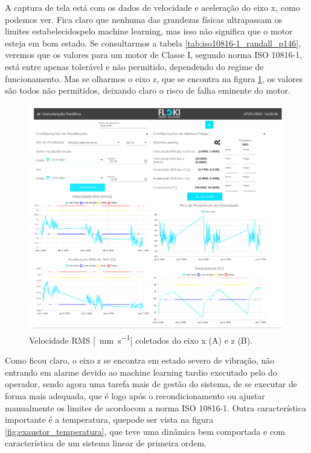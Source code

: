 A captura de tela está com os dados de velocidade e aceleração do eixo x, como podemos ver. Fica claro que nenhuma das grandezas físicas
ultrapassam os limites estabelecidospelo machine learning, mas isso não significa que o motor esteja em bom estado. Se consultarmos a tabela 
\ref{tab:iso10816-1_randall_p146}, veremos que os valores para um motor de Classe I, segundo norma  ISO 10816-1, está entre apenas tolerável e
não permitido, dependendo do regime de funcionamento. Mas se olharmos o eixo z, que se encontra na figura \ref{fig:exaustor_xz}, os valores são
todos não permitidos, deixando claro o risco de falha eminente do motor.

\begin{figure}[H]
    \caption{Velocidade RMS [\SI{}{\milli\metre\per\second}] coletados do eixo x (A) e z (B).}
    \begin{center}
        \includegraphics[scale=0.55, page=2]{resultados/img/resultados.pdf}
    \end{center}
    \label{fig:exaustor_xz}
\end{figure}

Como ficou claro, o eixo z se encontra em estado severo de vibração, não entrando em alarme devido ao machine learning tardio executado
pelo do operador, sendo agora uma tarefa mais de gestão do sistema, de se executar de forma mais adequada, que é logo após o recondicionamento 
ou ajustar manualmente os limites de acordocom a norma ISO 10816-1. Outra característica importante é a temperatura, quepode ser vista na figura
\ref{fig:exaustor_temperatura}, que teve uma dinâmica bem comportada e com característica de um sistema linear de primeira ordem.


